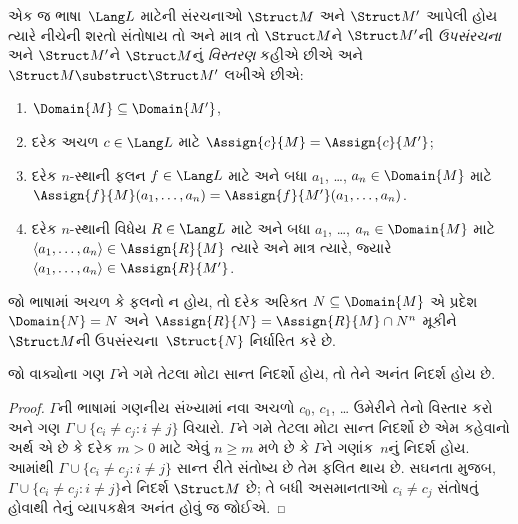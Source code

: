 \begin{defn}
એક જ ભાષા~$\Lang L$ માટેની સંરચનાઓ $\Struct M$ અને
$\Struct M'$ આપેલી હોય ત્યારે નીચેની શરતો સંતોષાય તો અને માત્ર તો
$\Struct M$ને $\Struct M'$ની \emph{ઉપસંરચના} અને
$\Struct M'$ને $\Struct M$નું \emph{વિસ્તરણ} કહીએ છીએ અને
$\Struct M \substruct \Struct M'$ લખીએ છીએ:
\begin{enumerate}
\item $\Domain{M} \subseteq \Domain{M'}$,
\item દરેક અચળ $c \in \Lang L$ માટે $\Assign{c}{M} =
    \Assign{c}{M'}$;
\item દરેક $n$-સ્થાની ફલન $f \in \Lang L$ માટે અને બધા
  $a_1$, \dots, $a_n \in \Domain{M}$ માટે
  $\Assign{f}{M}(a_1, \dots, a_n) = \Assign{f}{M'}(a_1, \dots, a_n)$.
\item દરેક $n$-સ્થાની વિધેય $R \in \Lang L$ માટે અને બધા
  $a_1$, \dots, $a_n \in \Domain{M}$ માટે $\langle
  a_1, \dots, a_n\rangle \in \Assign{R}{M}$ ત્યારે અને માત્ર ત્યારે,
  જ્યારે $\langle a_1, \dots, a_n\rangle \in \Assign{R}{M'}$.
\end{enumerate}
\end{defn}

\begin{rem}
જો ભાષામાં અચળ કે ફલનો ન હોય, તો દરેક અરિક્ત
$N \subseteq \Domain{M}$ એ પ્રદેશ~$\Domain{N} = N$ અને
$\Assign{R}{N} = \Assign{R}{M} \cap N^n$ મૂકીને $\Struct M$ની
ઉપસંરચના~$\Struct{N}$ નિર્ધારિત કરે છે.
\end{rem}
\endgroup


\begingroup
\makeatletter{}\makeatother

\label{guunit:OLP-0186}


\begin{thm}
 જો વાક્યોના ગણ $\Gamma$ને ગમે તેટલા મોટા સાન્ત
નિદર્શો હોય, તો તેને અનંત નિદર્શ હોય છે.
\end{thm}

\begin{proof}
$\Gamma$ની ભાષામાં ગણનીય સંખ્યામાં નવા અચળો $c_0$, $c_1$, \dots
ઉમેરીને તેનો વિસ્તાર કરો અને ગણ $\Gamma \cup \{c_i \neq c_j :
i \neq j\}$ વિચારો. $\Gamma$ને ગમે તેટલા મોટા સાન્ત નિદર્શો છે એમ
કહેવાનો અર્થ એ છે કે દરેક $m >0$ માટે એવું $n\ge m$ મળે છે કે
$\Gamma$ને ગણાંક~$n$નું નિદર્શ હોય. આમાંથી $\Gamma \cup \{c_i \neq
c_j : i \neq j\}$ સાન્ત રીતે સંતોષ્ય છે તેમ ફલિત થાય છે. સઘનતા મુજબ,
$\Gamma \cup \{c_i \neq c_j : i \neq j\}$ને નિદર્શ $\Struct M$ છે;
તે બધી અસમાનતાઓ $c_i \neq c_j$ સંતોષતું હોવાથી તેનું વ્યાપકક્ષેત્ર
અનંત હોવું જ જોઈએ.
\end{proof}

